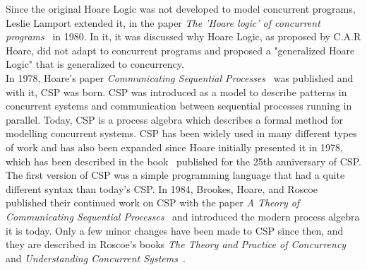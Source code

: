 Since the original Hoare Logic was not developed to model concurrent programs, Leslie Lamport extended it, in the paper \textit{The 'Hoare logic' of concurrent programs}~\cite{Lamport1980} in 1980. In it, it was discussed why Hoare Logic, as proposed by C.A.R Hoare, did not adapt to concurrent programs and proposed a "generalized Hoare Logic" that is generalized to concurrency. \\

In 1978, Hoare's paper \textit{Communicating Sequential Processes}~\cite{Hoare1978} was published and with it, CSP was born.
CSP was introduced as a model to describe patterns in concurrent systems and communication between sequential processes running in parallel. Today, CSP is a process algebra which describes a formal method for modelling concurrent systems.
CSP has been widely used in many different types of work and has also been expanded since Hoare initially presented it in 1978, which has been described in the book~\cite{Abdallah2005} published for the 25th anniversary of CSP.
The first version of CSP was a simple programming language that had a quite different syntax than today's CSP. In 1984, Brookes, Hoare, and Roscoe published their continued work on CSP with the paper \textit{A Theory of Communicating Sequential Processes}~\cite{Brookes1984} and introduced the modern process algebra it is today. Only a few minor changes have been made to CSP since then, and they are described in Roscoe's books \textit{The Theory and Practice of Concurrency}~\cite{Roscoe1997} and \textit{Understanding Concurrent Systems}~\cite{Roscoe2010}.
